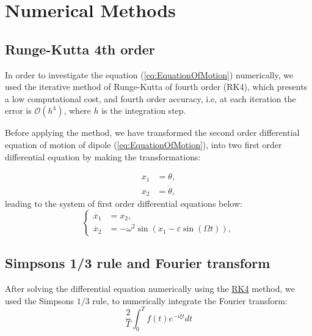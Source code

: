 \section{Numerical Methods}

\subsection{Runge-Kutta 4th order}
\label{sec:RK4}
In order to investigate the equation (\ref{eq:EquationOfMotion}) numerically, we used the iterative method of Runge-Kutta of fourth order (RK4), which presents a low computational cost, and fourth order accuracy, i.e, at each iteration the error is $\mathcal{O}(h^4)$, where $h$ is the integration step.

Before applying the method, we have transformed the second order differential equation of motion of dipole (\ref{eq:EquationOfMotion}), into two first order differential equation by making the transformations:

\begin{equation}
    \begin{aligned}
        x_1 &= \theta,\\
        x_2 &= \dot{\theta}, 
    \end{aligned}
\end{equation}
leading to the system of first order differential equations below:
\begin{equation}
    \begin{cases}
        \dot{x_1} &= x_2,\\
        \dot{x_2} &= -\omega^2 \sin(x_1 - \varepsilon \sin(\Omega t)),
    \end{cases}
\end{equation}
\subsection{Simpson\textquotesingle s 1/3 rule and Fourier transform}
After solving the differential equation numerically using the \hyperref[sec:RK4]{RK4} method, we used the Simpson\textquotesingle s $1/3$ rule, to numerically integrate the Fourier transform: 
\begin{equation}
    \dfrac{2}{T}\int_{0}^{T} f(t) e^{- i \xi t}dt
\end{equation}
